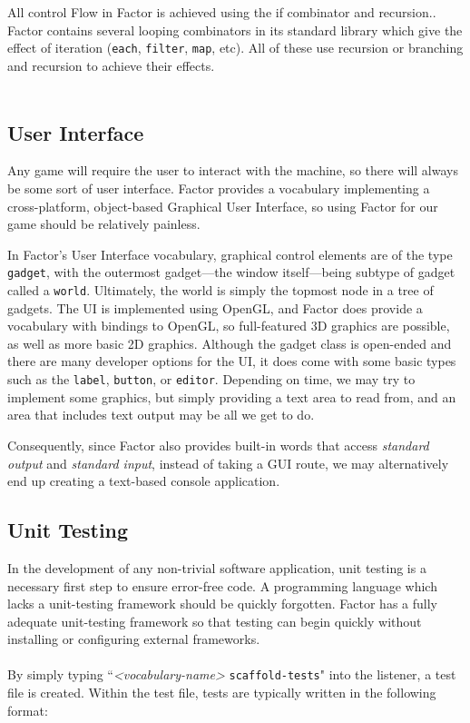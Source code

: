 \documentclass{sig-alternate}
\begin{document}
\\\\
All control Flow in Factor is achieved using the if combinator and recursion.\cite{FactorArticle}. 
Factor contains several looping combinators in its standard library which give the effect of iteration (\texttt{each}, \texttt{filter}, \texttt{map}, etc). All of these use recursion or branching
  and recursion to achieve their effects.\cite{Combinators}
\\\\
  
\subsection{User Interface}
Any game will require the user to interact with the machine, so there will always be some sort of user interface. Factor provides a vocabulary implementing a cross-platform, object-based Graphical User Interface,\cite{UIFramework} so using Factor for our game should be relatively painless.

In Factor's User Interface vocabulary, graphical control elements are of the type \texttt{gadget}, with the outermost gadget---the window itself---being subtype of gadget called a \texttt{world}. Ultimately, the world is simply the topmost node in a tree of gadgets. The UI is implemented using OpenGL, and Factor does provide a vocabulary with bindings to OpenGL, so full-featured 3D graphics are possible, as well as more basic 2D graphics. Although the gadget class is open-ended and there are many developer options for the UI, it does come with some basic types such as the \texttt{label}, \texttt{button}, or \texttt{editor}. Depending on time, we may try to implement some graphics, but simply providing a text area to read from, and an area that includes text output may be all we get to do.

Consequently, since Factor also provides built-in words that access \textit{standard output} and \textit{standard input}, instead of taking a GUI route, we may alternatively end up creating a text-based console application.

\subsection{Unit Testing}
In the development of any non-trivial software application, unit testing is a necessary first step to ensure error-free code. A programming language which lacks a unit-testing framework should be quickly forgotten. Factor has a fully adequate unit-testing framework so that testing can begin quickly without installing or configuring external frameworks. 
\\\\
   By simply typing ``\textit{<vocabulary-name>} \texttt{scaffold-tests}" into the listener, a test file is created. Within the test file, tests are typically written in the following format:
\end{document}
